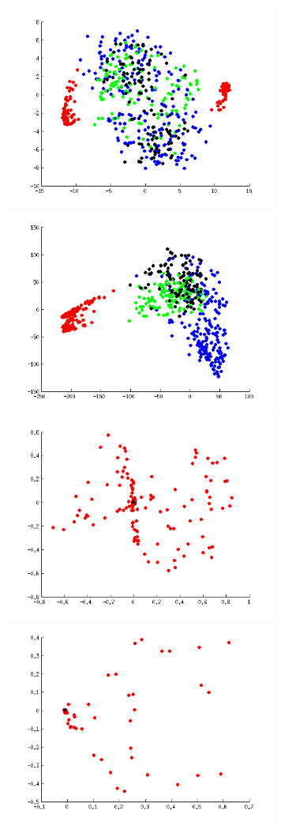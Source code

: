 \begin{figure}[H]
	\includegraphics[width=9cm]{linKernel.png}
	\label{fig:linker}
	\endminipage\hfill
	\includegraphics[width=9cm]{polyKernel.png}
	\label{fig:polker}
	\endminipage \\
	\includegraphics[width=9cm]{gaussianKernel.png}
	\label{fig:gaussker}
	\endminipage \hfill
	\includegraphics[width=9cm]{gaussianKernel2.png}

\end{figure}
